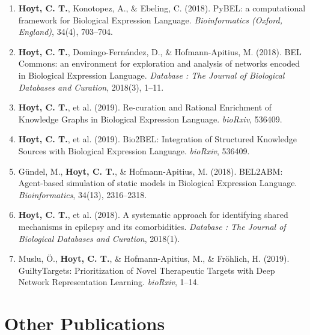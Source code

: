 \begin{enumerate}

\item \textbf{Hoyt, C. T.}, Konotopez, A., \& Ebeling, C. (2018). PyBEL: a computational framework for Biological Expression Language. \textit{Bioinformatics (Oxford, England)}, 34(4), 703–704.

\item \textbf{Hoyt, C. T.}, Domingo-Fernández, D., \& Hofmann-Apitius, M. (2018). BEL Commons: an environment for exploration and analysis of networks encoded in Biological Expression Language. \textit{Database : The Journal of Biological Databases and Curation}, 2018(3), 1–11.

\item \textbf{Hoyt, C. T.}, et al. (2019). Re-curation and Rational Enrichment of Knowledge Graphs in Biological Expression Language. \textit{bioRxiv}, 536409.

\item \textbf{Hoyt, C. T.}, et al. (2019). Bio2BEL: Integration of Structured Knowledge Sources with Biological Expression Language. \textit{bioRxiv}, 536409.

\item Gündel, M., \textbf{Hoyt, C. T.}, \& Hofmann-Apitius, M. (2018). BEL2ABM: Agent-based simulation of static models in Biological Expression Language. \textit{Bioinformatics}, 34(13), 2316–2318.

\item \textbf{Hoyt, C. T.}, et al. (2018). A systematic approach for identifying shared mechanisms in epilepsy and its comorbidities. \textit{Database : The Journal of Biological Databases and Curation}, 2018(1).

\item Muslu, Ö., \textbf{Hoyt, C. T.}, \& Hofmann-Apitius, M., \& Fröhlich, H. (2019). GuiltyTargets: Prioritization of Novel Therapeutic Targets with Deep Network Representation Learning. \textit{bioRxiv}, 1–14.

\end{enumerate}

\section*{Other Publications}

